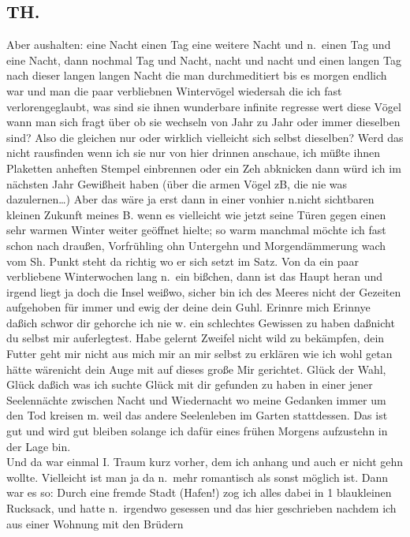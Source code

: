 \documentclass[
]{article}
\author{}
\date{\vspace{-2.5em}}
\begin{document}
\subsection{TH.}\label{th.}

Aber aushalten: eine Nacht einen Tag eine weitere Nacht und n.~einen Tag
und eine Nacht, dann nochmal Tag und Nacht, nacht und nacht und einen
langen Tag nach dieser langen langen Nacht die man durchmeditiert bis es
morgen endlich war und man die paar verbliebnen Wintervögel wiedersah
die ich fast verlorengeglaubt, was sind sie ihnen wunderbare infinite
regresse wert diese Vögel wann man sich fragt über ob sie wechseln von
Jahr zu Jahr oder immer dieselben sind? Also die gleichen nur oder
wirklich vielleicht sich selbst dieselben? Werd das nicht rausfinden
wenn ich sie nur von hier drinnen anschaue, ich müßte ihnen Plaketten
anheften Stempel einbrennen oder ein Zeh abknicken dann würd ich im
nächsten Jahr Gewißheit haben (über die armen Vögel zB, die nie was
dazulernen\ldots) Aber das wäre ja erst dann in einer vonhier n.nicht
sichtbaren kleinen Zukunft meines B. wenn es vielleicht wie jetzt seine
Türen gegen einen sehr warmen Winter weiter geöffnet hielte; so warm
manchmal möchte ich fast schon nach draußen, Vorfrühling ohn Untergehn
und Morgendämmerung wach vom Sh. Punkt steht da richtig wo er sich setzt
im Satz. Von da ein paar verbliebene Winterwochen lang n.~ein bißchen,
dann ist das Haupt heran und irgend liegt ja doch die Insel weißwo,
sicher bin ich des Meeres nicht der Gezeiten aufgehoben für immer und
ewig der deine dein Guhl. Erinnre mich Erinnye daßich schwor dir
gehorche ich nie w. ein schlechtes Gewissen zu haben daßnicht du selbst
mir auferlegtest. Habe gelernt Zweifel nicht wild zu bekämpfen, dein
Futter geht mir nicht aus mich mir an mir selbst zu erklären wie ich
wohl getan hätte wärenicht dein Auge mit auf dieses große Mir gerichtet.
Glück der Wahl, Glück daßich was ich suchte Glück mit dir gefunden zu
haben in einer jener Seelennächte zwischen Nacht und Wiedernacht wo
meine Gedanken immer um den Tod kreisen m. weil das andere Seelenleben
im Garten stattdessen. Das ist gut und wird gut bleiben solange ich
dafür eines frühen Morgens aufzustehn in der Lage bin.\\
Und da war einmal I. Traum kurz vorher, dem ich anhang und auch er nicht
gehn wollte. Vielleicht ist man ja da n.~mehr romantisch als sonst
möglich ist. Dann war es so: Durch eine fremde Stadt (Hafen!) zog ich
alles dabei in 1 blaukleinen Rucksack, und hatte n.~irgendwo gesessen
und das hier geschrieben nachdem ich aus einer Wohnung mit den Brüdern
\end{document}
